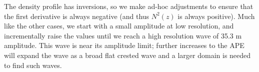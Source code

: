 \documentclass[letterpaper]{article}
\begin{document}
The density profile has inversions, so we make ad-hoc adjustments to ensure that the first derivative is always negative (and thus $N^2(z)$ is always positive).
Much like the other cases, we start with a small amplitude at low resolution, and incrementally raise the values until we reach a high resolution wave of 35.3 m amplitude.
This wave is near its amplitude limit; further increases to the APE will expand the wave as a broad flat crested wave and a larger domain is needed to find such waves.



\end{document}
